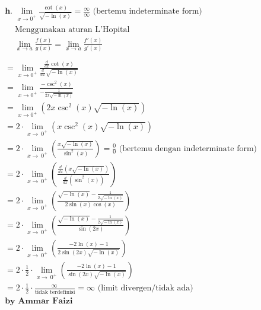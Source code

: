 \documentclass[12pt]{article}
\begin{document}
\begin{fleqn}[1em]
\begin{align*}
\boxed{
\begin{aligned}
  & \textbf{h. } \lim_{x \to 0^{+}} \frac{\cot(x)}{\sqrt{-\ln(x)}} = \frac{\infty}{\infty} \text{ (bertemu indeterminate form)} \\
  & \boxed{
    \begin{aligned}
      & \text{Menggunakan aturan L'Hopital} \\
      & \lim_{x \to a} \frac{f(x)}{g(x)} = \lim_{x \to a} \frac{f'(x)}{g'(x)} \\
    \end{aligned}
  } \\
  & = \lim_{x \to 0^{+}} \frac{\frac{d}{dx}\cot(x)}{\frac{d}{dx}\sqrt{-\ln(x)}} \\
  & = \lim_{x\to 0^+} \frac{-\csc^2(x)}{-\frac{1}{2x\sqrt{-\ln(x)}}} \\
  & = \lim_{x\to 0^+}\left(2x\csc ^2\left(x\right)\sqrt{-\ln \left(x\right)}\right) \\
  & = 2\cdot \lim _{x\to \:0^+}\left(x\csc ^2\left(x\right)\sqrt{-\ln \left(x\right)}\right) \\
  & = 2\cdot \lim _{x\to \:0^+}\left(\frac{x\sqrt{-\ln \left(x\right)}}{\sin ^2\left(x\right)}\right)
    = \frac{0}{0} \text{ (bertemu dengan indeterminate form)} \\
  & = 2\cdot \lim _{x\to \:0^+}\left(\frac{\frac{d}{dx} \left(x\sqrt{-\ln \left(x\right)}\right)}{\frac{d}{dx} (\sin ^2\left(x\right))}\right) \\
  & =2\cdot \lim _{x\to \:0^+}\left(\frac{\sqrt{-\ln \left(x\right)}-\frac{1}{2\sqrt{-\ln \left(x\right)}}}{2 \sin(x) \cos(x)}\right) \\
  & =2\cdot \lim _{x\to \:0^+}\left(\frac{\sqrt{-\ln \left(x\right)}-\frac{1}{2\sqrt{-\ln \left(x\right)}}}{\sin \left(2x\right)}\right) \\
  & =2\cdot \lim _{x\to \:0^+}\left(\frac{-2\ln \left(x\right)-1}{2\sin \left(2x\right)\sqrt{-\ln \left(x\right)}}\right) \\
  & = 2\cdot \frac{1}{2}\cdot \lim _{x\to \:0^+}\left(\frac{-2\ln \left(x\right)-1}{\sin \left(2x\right)\sqrt{-\ln \left(x\right)}}\right) \\
  & = 2\cdot \frac{1}{2}\cdot \frac{\infty \:}{\text{tidak terdefinisi}} = \infty \text{ (limit divergen/tidak ada)}
  \\ & \textbf{by Ammar Faizi}
\end{aligned}
}
\end{align*}

\end{fleqn}
\end{document}

